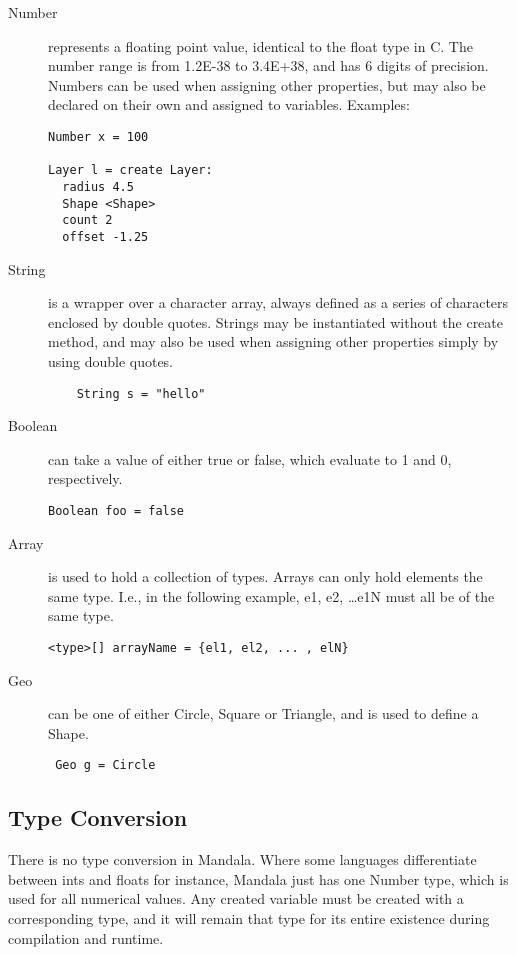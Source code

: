 \documentclass[12pt]{report}
\begin{document}
    \begin{description}
	
    \item[Number] represents a floating point value, identical to the float type in C. The number range is from 1.2E-38 to 3.4E+38, and has 6 digits of precision. Numbers can be used when assigning other properties, but may also be declared on their own and assigned to variables. Examples:
    \begin{verbatim}
Number x = 100

Layer l = create Layer:
  radius 4.5
  Shape <Shape>
  count 2
  offset -1.25
    \end{verbatim}

	
    \item[String] is a wrapper over a character array, always defined as a series of characters enclosed by double quotes. Strings may be instantiated without the create method, and may also be used when assigning other properties simply by using double quotes. 
	\begin{verbatim}	String s = "hello" \end{verbatim}


	
    \item[Boolean] can take a value of either true or false, which evaluate to 1 and 0, respectively.
    \begin{verbatim}
Boolean foo = false
\end{verbatim}
	
    \item[Array] is used to hold a collection of types. Arrays can only hold elements the same type. I.e., in the following example, e1, e2, \dots e1N must all be of the same type.
\begin{verbatim}<type>[] arrayName = {el1, el2, ... , elN}\end{verbatim}


	
    \item[Geo] can be one of either Circle, Square or Triangle, and is used to define a Shape. 
\begin{verbatim} Geo g = Circle \end{verbatim}
    
    \end{description}
    
    \subsection*{Type Conversion} There is no type conversion in Mandala. Where some languages differentiate between ints and floats for instance, Mandala just has one Number type, which is used for all numerical values. Any created variable must be created with a corresponding type, and it will remain that type for its entire existence during compilation and runtime.
\end{document}

